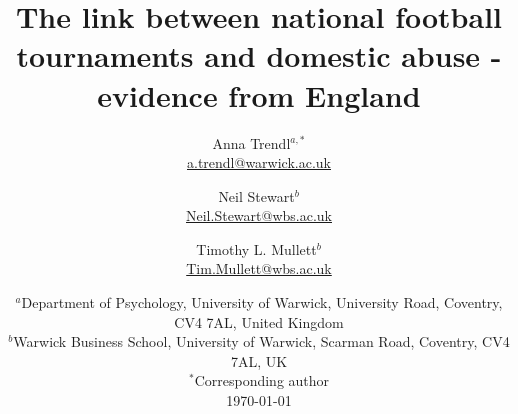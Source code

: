 \documentclass[12pt, a4paper]{article}
\title{}
\author{}
\date{}
\begin{document}
\title{The link between national football tournaments and domestic abuse - evidence from England}

\author{Anna Trendl$^{a,*}$ \\ \href{mailto:a.trendl@warwick.ac.uk}{a.trendl@warwick.ac.uk}\\
 \and Neil Stewart$^b$ \\ 
 \href{mailto:neil.stewart@wbs.ac.uk}{Neil.Stewart@wbs.ac.uk}
 \\ 
 \and Timothy L. Mullett$^b$ \\
 \href{mailto:Tim.Mullett@wbs.ac.uk}{Tim.Mullett@wbs.ac.uk}
 \\}
 
\date{
    $^a$Department of Psychology, University of Warwick, University Road, Coventry, CV4 7AL, United Kingdom\\
    $^b$Warwick Business School, University of Warwick, Scarman Road, Coventry, CV4 7AL, UK\\
    $^*$Corresponding author\\[2ex]%
    \today
}
\end{document}
